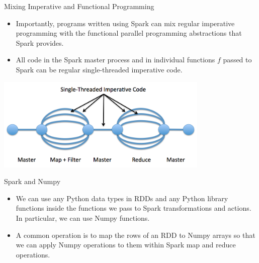\documentclass[serif,xcolor=pdftex,dvipsnames,table,hyperref={bookmarks=false,breaklinks}]{beamer}
\begin{document}
\begin{frame}[t]{Mixing Imperative and Functional Programming}

\begin{itemize}

\item Importantly, programs written using Spark can mix regular imperative
programming with the functional parallel programming abstractions that Spark 
provides.

\pause\item All code in the Spark master process and in individual functions $f$
passed to Spark can be regular single-threaded imperative code.

\end{itemize}

\pause
\includegraphics[width=4in]{../Figures/spark_flow.png}

\end{frame}

\begin{frame}[t]{Spark and Numpy}

\begin{itemize}

\item We can use any Python data types in RDDs and any Python 
library functions inside the functions we pass to Spark transformations and 
actions. In particular, we can use Numpy functions.

\pause\item A common operation is to map the rows of an RDD to Numpy arrays
so that we can apply Numpy operations to them within Spark map and reduce operations.

\end{itemize}

\end{frame}
\end{document}
